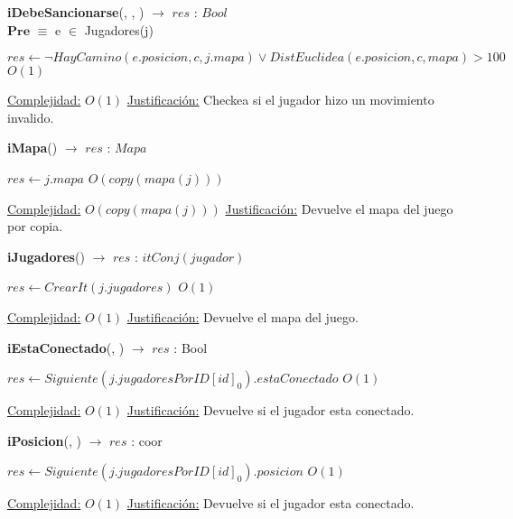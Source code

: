 \begin{algorithm}[H]{\textbf{iDebeSancionarse}(, , ) $\to$ $res$ : $Bool$} 
\\
	{$\textbf{Pre}$ $\equiv$ e $\in$ Jugadores(j)}
	\begin{algorithmic}
		\State $res \gets \neg HayCamino(e.posicion, c, j.mapa) \lor DistEuclidea(e.posicion, c, mapa) > 100 $ \Comment $O(1)$
	
		\medskip
		\Statex \underline{Complejidad:} $O(1)$
		\Statex \underline{Justificación:} Checkea si el jugador hizo un movimiento invalido.
    \end{algorithmic}
\end{algorithm}

\begin{algorithm}[H]{\textbf{iMapa}() $\to$ $res$ : $Mapa$} 
	{}
	\begin{algorithmic}
		\State $res \gets j.mapa $ \Comment $O(copy(mapa(j)))$
	
		\medskip
		\Statex \underline{Complejidad:} $O(copy(mapa(j)))$
		\Statex \underline{Justificación:} Devuelve el mapa del juego por copia.
    \end{algorithmic}
\end{algorithm}

\begin{algorithm}[H]{\textbf{iJugadores}() $\to$ $res$ : $itConj(jugador)$} 
	{}
	\begin{algorithmic}
		\State $res \gets CrearIt(j.jugadores) $ \Comment $O(1)$
	
		\medskip
		\Statex \underline{Complejidad:} $O(1)$
		\Statex \underline{Justificación:} Devuelve el mapa del juego.
    \end{algorithmic}
\end{algorithm}

\begin{algorithm}[H]{\textbf{iEstaConectado}(, ) $\to$ $res$ : Bool} 
	{}
	\begin{algorithmic}
		\State $res \gets Siguiente(j.jugadoresPorID[id]_0).estaConectado $ \Comment $O(1)$
	
		\medskip
		\Statex \underline{Complejidad:} $O(1)$
		\Statex \underline{Justificación:} Devuelve si el jugador esta conectado.
    \end{algorithmic}
\end{algorithm}

\begin{algorithm}[H]{\textbf{iPosicion}(, ) $\to$ $res$ : coor} 
	{}
	\begin{algorithmic}
		\State $res \gets Siguiente(j.jugadoresPorID[id]_0).posicion $ \Comment $O(1)$
	
		\medskip
		\Statex \underline{Complejidad:} $O(1)$
		\Statex \underline{Justificación:} Devuelve si el jugador esta conectado.
    \end{algorithmic}
\end{algorithm}

